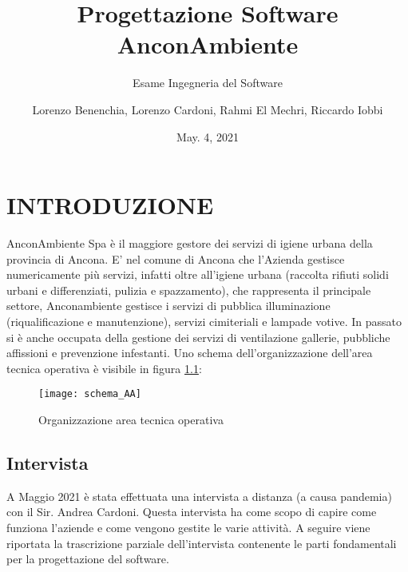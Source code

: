 \documentclass[green, fancy, 11pt]{elegantbook}
\title{Progettazione Software AnconAmbiente}
\subtitle{Esame Ingegneria del Software}
\author{Lorenzo Benenchia, Lorenzo Cardoni, Rahmi El Mechri, Riccardo Iobbi}
\institute{UNIVPM}
\date{May. 4, 2021}
\begin{document}
\maketitle
\frontmatter
\tableofcontents
\mainmatter

\chapter{INTRODUZIONE}
AnconAmbiente Spa è il maggiore gestore dei servizi di igiene urbana della provincia di Ancona.
E’ nel comune di Ancona che l’Azienda gestisce numericamente più servizi, infatti oltre all’igiene urbana (raccolta rifiuti solidi urbani e differenziati, pulizia e spazzamento), che rappresenta il principale settore, Anconambiente gestisce i servizi di pubblica illuminazione (riqualificazione e manutenzione), servizi cimiteriali e lampade votive. In passato si è anche occupata della gestione dei servizi di ventilazione gallerie, 
pubbliche affissioni e prevenzione infestanti.
Uno schema dell'organizzazione dell'area tecnica operativa è visibile in figura \ref{organigramma}:

\begin{figure}[H]
	\centering
	\texttt{[image: schema\_AA]}\\
	\caption{Organizzazione area tecnica operativa}
	\label{organigramma}
\end{figure}
\newpage

\section{Intervista}
A Maggio 2021 è stata effettuata una intervista a distanza (a causa pandemia) con il Sir. Andrea Cardoni.
Questa intervista ha come scopo di capire come funziona l'aziende e come vengono gestite le varie attività.
A seguire viene riportata la trascrizione parziale dell'intervista contenente le parti fondamentali per la progettazione del software.
\end{document}
